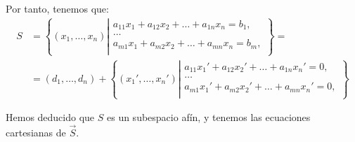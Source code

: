\begin{ejercicio}
    Por tanto, tenemos que:
    \begin{equation*}
        \begin{split}
            S &= \left\{
            (x_1,\dots,x_n) \left|
            \begin{array}{c}
                a_{11}x_1+a_{12}x_2 + \dots + a_{1n}x_n=b_1, \\
                \dots \\
                a_{m1}x_1+a_{m2}x_2 + \dots + a_{mn}x_n=b_m, \\
            \end{array}
            \right.\right\} =\\
            &= (d_1,\dots,d_n) + \left\{
            (x_1',\dots,x_n') \left|
            \begin{array}{c}
                a_{11}x_1'+a_{12}x_2' + \dots + a_{1n}x_n'=0, \\
                \dots \\
                a_{m1}x_1'+a_{m2}x_2' + \dots + a_{mn}x_n'=0, \\
            \end{array}
            \right.\right\}
        \end{split}
    \end{equation*}


    Hemos deducido que $S$ es un subespacio afín, y tenemos las ecuaciones cartesianas de $\vec{S}$.
\end{ejercicio}



